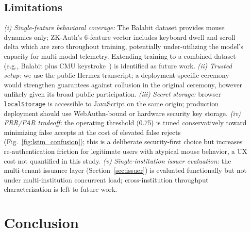 \documentclass[journal,twoside,10pt]{IEEEtran}
\begin{document}
\subsection{Limitations}

\textit{(i) Single-feature behavioral coverage:} The Balabit dataset
provides mouse dynamics only; ZK-Auth's 6-feature vector includes keyboard
dwell and scroll delta which are zero throughout training, potentially
under-utilizing the model's capacity for multi-modal telemetry. Extending
training to a combined dataset (e.g., Balabit plus CMU
keystroke~\cite{killourhy09}) is identified as future work.
\textit{(ii) Trusted setup:} we use the public Hermez transcript; a
deployment-specific ceremony would strengthen guarantees against
collusion in the original ceremony, however unlikely given its broad
public participation.
\textit{(iii) Secret storage:} browser \texttt{localStorage} is accessible
to JavaScript on the same origin; production deployment should use
WebAuthn-bound or hardware security key storage.
\textit{(iv) FRR/FAR tradeoff:} the operating threshold (0.75) is tuned
conservatively toward minimizing false accepts at the cost of elevated
false rejects (Fig.~\ref{fig:lstm_confusion}); this is a deliberate
security-first choice but increases re-authentication friction for
legitimate users with atypical mouse behavior, a UX cost not quantified in
this study.
\textit{(v) Single-institution issuer evaluation:} the multi-tenant
issuance layer (Section~\ref{sec:issuer}) is evaluated functionally but not
under multi-institution concurrent load; cross-institution throughput
characterization is left to future work.

\section{Conclusion}
\label{sec:conclusion}
\end{document}
